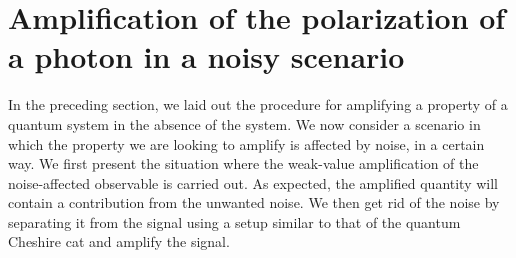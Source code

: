 \documentclass[aps,pra,showpacs,twoside,twocolumn,10pt]{revtex4-1}
\begin{document}
    
\section{Amplification of the polarization of a photon in a noisy scenario}
\label{section:4}
In the preceding section, we laid out the procedure for amplifying a property of a quantum system in the absence of the system. We now consider a scenario in which the property we are looking to amplify is affected by noise, in a certain way.
We first present the situation where the weak-value amplification of the noise-affected observable is carried out. As expected, the amplified quantity will contain a contribution from the unwanted noise. We then get rid of the noise by separating it from the signal using a setup similar to that of the quantum Cheshire cat and amplify the signal. 

   
\end{document}
